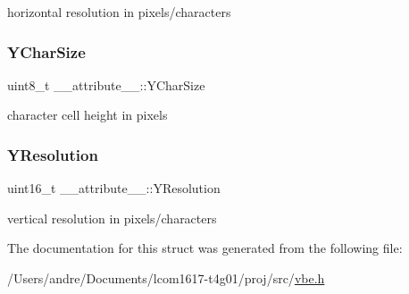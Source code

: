 horizontal resolution in pixels/characters 

\hypertarget{struct____attribute_____acb93d86860efea5c87e3c2950f39123e}{}\label{struct____attribute_____acb93d86860efea5c87e3c2950f39123e} 
\subsubsection{\texorpdfstring{Y\+Char\+Size}{YCharSize}}
{\footnotesize\ttfamily uint8\+\_\+t \+\_\+\+\_\+attribute\+\_\+\+\_\+\+::\+Y\+Char\+Size}



character cell height in pixels 

\hypertarget{struct____attribute_____aa91385451d974d9c33978062e22d39e2}{}\label{struct____attribute_____aa91385451d974d9c33978062e22d39e2} 
\subsubsection{\texorpdfstring{Y\+Resolution}{YResolution}}
{\footnotesize\ttfamily uint16\+\_\+t \+\_\+\+\_\+attribute\+\_\+\+\_\+\+::\+Y\+Resolution}



vertical resolution in pixels/characters 



The documentation for this struct was generated from the following file\+:\begin{DoxyCompactItemize}
\item 
/\+Users/andre/\+Documents/lcom1617-\/t4g01/proj/src/\hyperlink{vbe_8h}{vbe.\+h}\end{DoxyCompactItemize}
